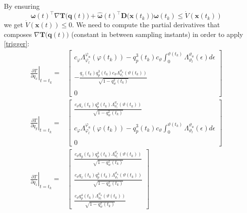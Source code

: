 \documentclass{article}
\begin{document}
		By ensuring
		\begin{equation}
			\boldsymbol \omega(t)^\top  \nabla \mathbf{T(q}(t)) + \hat{\boldsymbol \omega}(t)^\top \mathbf{D(x}(t_k)) \boldsymbol \omega(t_k) \leq \dot V(\mathbf{x}(t_k)) 
			\label{trigger}
		\end{equation}
		we get $\dot V(\mathbf{x}(t)) \leq 0$. We need to compute the partial derivatives that composes $\nabla \mathbf{T(q}(t))$ (constant in between sampling instants) in order to apply \eqref{trigger}:
		\begin{eqnarray*}
				\left .\frac{\partial T}{\partial q_x}\right |_{t=t_k}  =& \begin{bmatrix}
												c_\varphi \Lambda_{\varphi_l}^{\varphi_u}(\varphi(t_k)) - q_p^3(t_k) c_\vartheta \displaystyle \int_0^{\vartheta(t_k)}{\Lambda_{\vartheta_l}^{\vartheta_u}(\epsilon)} d\epsilon \\\\
												-\displaystyle \frac{q_z(t_k) q_p^3(t_k) c_\vartheta \Lambda_{\vartheta_l}^{\vartheta_u}(\vartheta(t_k))}{\sqrt{1-q_w^2(t_k)}}\\\\
												0
											   \end{bmatrix}
											   \\
				\left .\frac{\partial T}{\partial q_y}\right |_{t=t_k}  =& \begin{bmatrix}
												\displaystyle\frac{c_\vartheta q_z(t_k) q_p^3(t_k) \Lambda_{\vartheta_l}^{\vartheta_u}(\vartheta(t_k))}{\sqrt{1-q_w^2(t_k)}} \\\\
												c_\varphi \Lambda_{\varphi_l}^{\varphi_u}(\varphi(t_k)) - q_p^3(t_k) c_\vartheta \displaystyle \int_0^{\vartheta(t_k)}{\Lambda_{\vartheta_l}^{\vartheta_u}(\epsilon)} d\epsilon\\\\
												0
											   \end{bmatrix}
											   \\
				\left .\frac{\partial T}{\partial q_z}\right |_{t=t_k}  =& \begin{bmatrix}
												\displaystyle \frac{c_\vartheta q_y(t_k) q_p^3(t_k) \Lambda_{\vartheta_l}^{\vartheta_u}(\vartheta(t_k))}{\sqrt{1-q_w^2(t_k)}} \\\\
												\displaystyle \frac{c_\vartheta q_x(t_k) q_p^3(t_k) \Lambda_{\vartheta_l}^{\vartheta_u}(\vartheta(t_k))}{\sqrt{1-q_w^2(t_k)}} \\\\
												\displaystyle \frac{c_\vartheta q_p^4(t_k) \Lambda_{\vartheta_l}^{\vartheta_u}(\vartheta(t_k))}{\sqrt{1-q_w^2(t_k)}}
											   \end{bmatrix}
		\end{eqnarray*}
\end{document}

